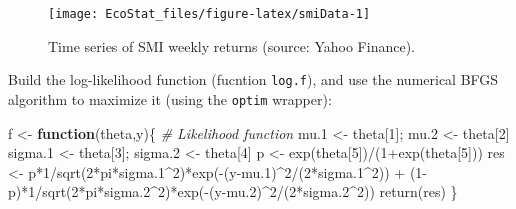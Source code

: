 \documentclass[
  12pt,
]{book}
\newenvironment{Shaded}{\begin{snugshade}}{\end{snugshade}}
\newcommand{\CommentTok}[1]{\textcolor[rgb]{0.56,0.35,0.01}{\textit{#1}}}
\newcommand{\ControlFlowTok}[1]{\textcolor[rgb]{0.13,0.29,0.53}{\textbf{#1}}}
\newcommand{\DecValTok}[1]{\textcolor[rgb]{0.00,0.00,0.81}{#1}}
\newcommand{\FloatTok}[1]{\textcolor[rgb]{0.00,0.00,0.81}{#1}}
\newcommand{\FunctionTok}[1]{\textcolor[rgb]{0.00,0.00,0.00}{#1}}
\newcommand{\NormalTok}[1]{#1}
\newcommand{\OtherTok}[1]{\textcolor[rgb]{0.56,0.35,0.01}{#1}}
\newcommand{\SpecialCharTok}[1]{\textcolor[rgb]{0.00,0.00,0.00}{#1}}
\theoremstyle{definition}
\theoremstyle{definition}
\theoremstyle{definition}
\theoremstyle{definition}
\theoremstyle{remark}
\begin{document}
\begin{figure}
\texttt{[image: EcoStat\_files/figure-latex/smiData-1]} \caption{Time series of SMI weekly returns (source: Yahoo Finance).}\label{fig:smiData}
\end{figure}

Build the log-likelihood function (fucntion \texttt{log.f}), and use the numerical BFGS algorithm to maximize it (using the \texttt{optim} wrapper):

\begin{Shaded}
\begin{Highlighting}[]
\NormalTok{f }\OtherTok{\textless{}{-}} \ControlFlowTok{function}\NormalTok{(theta,y)\{ }\CommentTok{\# Likelihood function}
\NormalTok{  mu}\FloatTok{.1} \OtherTok{\textless{}{-}}\NormalTok{ theta[}\DecValTok{1}\NormalTok{]; mu}\FloatTok{.2} \OtherTok{\textless{}{-}}\NormalTok{ theta[}\DecValTok{2}\NormalTok{]}
\NormalTok{  sigma}\FloatTok{.1} \OtherTok{\textless{}{-}}\NormalTok{ theta[}\DecValTok{3}\NormalTok{]; sigma}\FloatTok{.2} \OtherTok{\textless{}{-}}\NormalTok{ theta[}\DecValTok{4}\NormalTok{]}
\NormalTok{  p }\OtherTok{\textless{}{-}} \FunctionTok{exp}\NormalTok{(theta[}\DecValTok{5}\NormalTok{])}\SpecialCharTok{/}\NormalTok{(}\DecValTok{1}\SpecialCharTok{+}\FunctionTok{exp}\NormalTok{(theta[}\DecValTok{5}\NormalTok{]))}
\NormalTok{  res }\OtherTok{\textless{}{-}}\NormalTok{ p}\SpecialCharTok{*}\DecValTok{1}\SpecialCharTok{/}\FunctionTok{sqrt}\NormalTok{(}\DecValTok{2}\SpecialCharTok{*}\NormalTok{pi}\SpecialCharTok{*}\NormalTok{sigma}\FloatTok{.1}\SpecialCharTok{\^{}}\DecValTok{2}\NormalTok{)}\SpecialCharTok{*}\FunctionTok{exp}\NormalTok{(}\SpecialCharTok{{-}}\NormalTok{(y}\SpecialCharTok{{-}}\NormalTok{mu}\FloatTok{.1}\NormalTok{)}\SpecialCharTok{\^{}}\DecValTok{2}\SpecialCharTok{/}\NormalTok{(}\DecValTok{2}\SpecialCharTok{*}\NormalTok{sigma}\FloatTok{.1}\SpecialCharTok{\^{}}\DecValTok{2}\NormalTok{)) }\SpecialCharTok{+}
\NormalTok{    (}\DecValTok{1}\SpecialCharTok{{-}}\NormalTok{p)}\SpecialCharTok{*}\DecValTok{1}\SpecialCharTok{/}\FunctionTok{sqrt}\NormalTok{(}\DecValTok{2}\SpecialCharTok{*}\NormalTok{pi}\SpecialCharTok{*}\NormalTok{sigma}\FloatTok{.2}\SpecialCharTok{\^{}}\DecValTok{2}\NormalTok{)}\SpecialCharTok{*}\FunctionTok{exp}\NormalTok{(}\SpecialCharTok{{-}}\NormalTok{(y}\SpecialCharTok{{-}}\NormalTok{mu}\FloatTok{.2}\NormalTok{)}\SpecialCharTok{\^{}}\DecValTok{2}\SpecialCharTok{/}\NormalTok{(}\DecValTok{2}\SpecialCharTok{*}\NormalTok{sigma}\FloatTok{.2}\SpecialCharTok{\^{}}\DecValTok{2}\NormalTok{))}
  \FunctionTok{return}\NormalTok{(res)}
\NormalTok{\}}

\end{Highlighting}
\end{Shaded}
\end{document}
